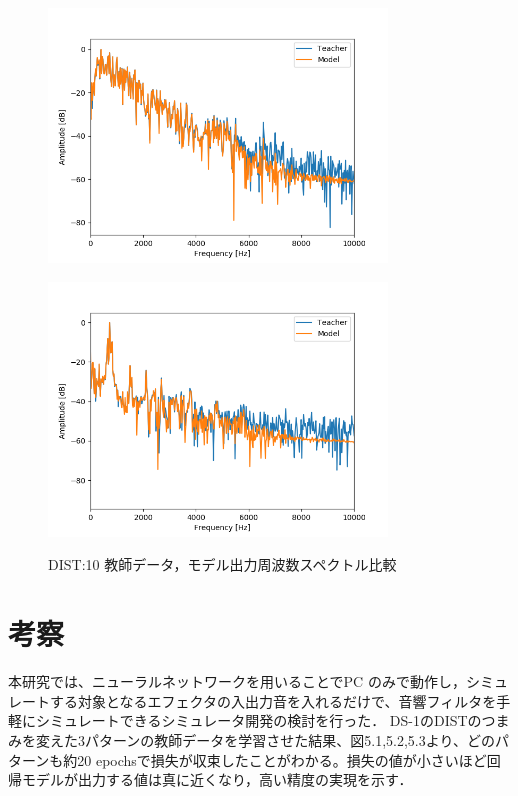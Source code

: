 \documentclass{jreport}		%
\begin{document}
\begin{figure}[htbp]
 \begin{minipage}{0.5\hsize}
 \begin{center}
  \includegraphics[width=90mm]{gain10_fft_hikaku.png}
 \end{center}
 \label{fig:one}
 \end{minipage}
 \begin{minipage}{0.5\hsize}
 \begin{center}
  \includegraphics[width=90mm]{gain10_fft_hikaku2.png}
 \end{center}
 \label{fig:two}
 \end{minipage}
 \caption{DIST:10 教師データ，モデル出力周波数スペクトル比較}
\end{figure}

\chapter{考察}
本研究では、ニューラルネットワークを用いることでPC のみで動作し，シミュレートする対象となるエフェクタの入出力音を入れるだけで、音響フィルタを手軽にシミュレートできるシミュレータ開発の検討を行った．
DS-1のDISTのつまみを変えた3パターンの教師データを学習させた結果、図5.1,5.2,5.3より、どのパターンも約20 epochsで損失が収束したことがわかる。損失の値が小さいほど回帰モデルが出力する値は真に近くなり，高い精度の実現を示す．
\end{document}
